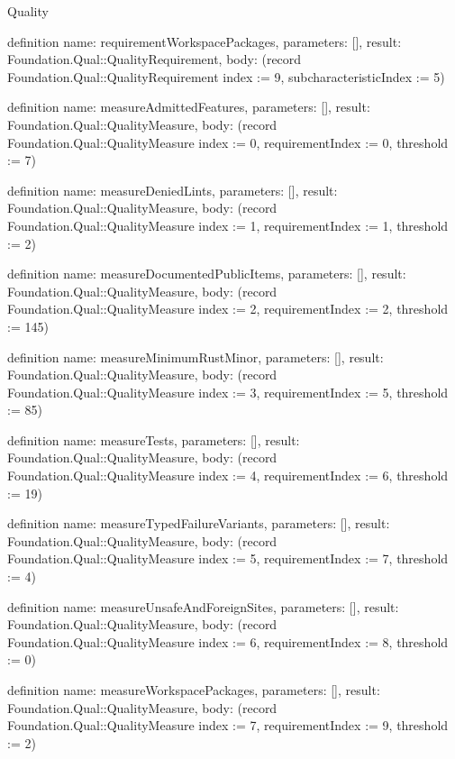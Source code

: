 \begin{lexlean}{Quality}
\begin{semanticmodule}
definition{
  name: requirementWorkspacePackages,
  parameters: [],
  result: Foundation.Qual::QualityRequirement,
  body: (record Foundation.Qual::QualityRequirement {index := 9, subcharacteristicIndex := 5})
}

definition{
  name: measureAdmittedFeatures,
  parameters: [],
  result: Foundation.Qual::QualityMeasure,
  body: (record Foundation.Qual::QualityMeasure {index := 0, requirementIndex := 0, threshold := 7})
}

definition{
  name: measureDeniedLints,
  parameters: [],
  result: Foundation.Qual::QualityMeasure,
  body: (record Foundation.Qual::QualityMeasure {index := 1, requirementIndex := 1, threshold := 2})
}

definition{
  name: measureDocumentedPublicItems,
  parameters: [],
  result: Foundation.Qual::QualityMeasure,
  body: (record Foundation.Qual::QualityMeasure {index := 2, requirementIndex := 2, threshold := 145})
}

definition{
  name: measureMinimumRustMinor,
  parameters: [],
  result: Foundation.Qual::QualityMeasure,
  body: (record Foundation.Qual::QualityMeasure {index := 3, requirementIndex := 5, threshold := 85})
}

definition{
  name: measureTests,
  parameters: [],
  result: Foundation.Qual::QualityMeasure,
  body: (record Foundation.Qual::QualityMeasure {index := 4, requirementIndex := 6, threshold := 19})
}

definition{
  name: measureTypedFailureVariants,
  parameters: [],
  result: Foundation.Qual::QualityMeasure,
  body: (record Foundation.Qual::QualityMeasure {index := 5, requirementIndex := 7, threshold := 4})
}

definition{
  name: measureUnsafeAndForeignSites,
  parameters: [],
  result: Foundation.Qual::QualityMeasure,
  body: (record Foundation.Qual::QualityMeasure {index := 6, requirementIndex := 8, threshold := 0})
}

definition{
  name: measureWorkspacePackages,
  parameters: [],
  result: Foundation.Qual::QualityMeasure,
  body: (record Foundation.Qual::QualityMeasure {index := 7, requirementIndex := 9, threshold := 2})
}
\end{semanticmodule}
\end{lexlean}
